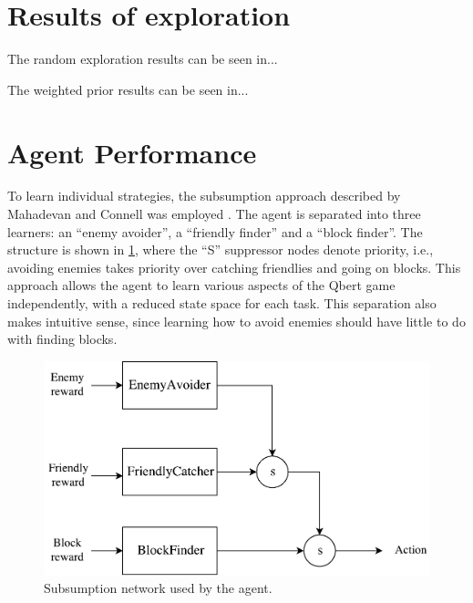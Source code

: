 \documentclass[a4paper,titlepage]{article}
\begin{document}
	
	
	\section{Results of exploration}
	
	The random exploration results can be seen in...
	
	
	The weighted prior results can be seen in...
	
	
	
	\section{Agent Performance}
	
	To learn individual strategies, the subsumption approach described by Mahadevan and Connell was employed \cite{mahadevan}. The agent is separated into three learners: an ``enemy avoider'', a ``friendly finder'' and a ``block finder''. The structure is shown in \cref{fig:subsumption}, where the ``S'' suppressor nodes denote priority, i.e., avoiding enemies takes priority over catching friendlies and going on blocks. This approach allows the agent to learn various aspects of the Qbert game independently, with a reduced state space for each task. This separation also makes intuitive sense, since learning how to avoid enemies should have little to do with finding blocks.
	
	\begin{figure}[!htb]
		\centering
		\includegraphics[width=\columnwidth]{plots/subsumption.pdf}
		\caption
		{Subsumption network used by the agent.}
		\label{fig:subsumption}
	\end{figure}
\end{document}
